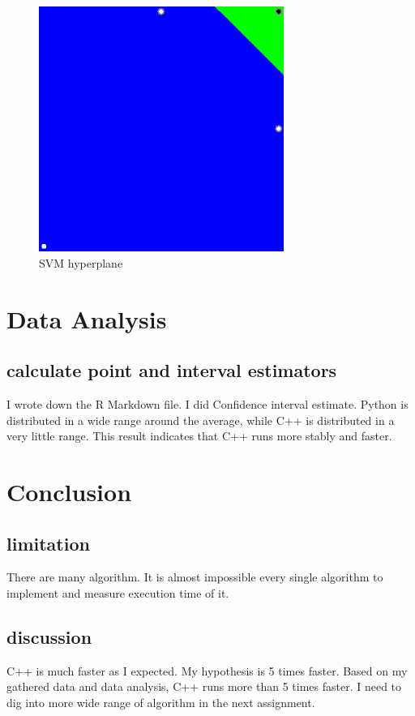 \documentclass[11pt, a4paper]{article}
\begin{document}
\begin{figure}[htbp]
\centering
\includegraphics[clip, width=80mm]{result.png}
\caption{SVM hyperplane}
\end{figure}

\section{Data Analysis}
\subsection{calculate point and interval estimators}
I wrote down the R Markdown file. I did Confidence interval estimate. Python is distributed in a wide range around the average, while C++ is distributed in a very little range. This result indicates that C++ runs more stably and faster. 

\section{Conclusion}
\subsection{limitation}
There are many algorithm. It is almost impossible every single algorithm to implement and measure execution time of it. 
\subsection{discussion}
C++ is much faster as I expected. My hypothesis is 5 times faster. Based on my gathered data and data analysis, C++ runs more than 5 times faster. I need to dig into more wide range of algorithm in the next assignment.
\end{document}

